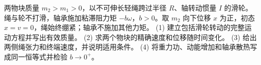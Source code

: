 两物块质量 \(m_2>m_1>0\)，以不可伸长轻绳跨过半径 \(R\)、轴转动惯量 \(I\) 的滑轮。绳与轮不打滑，轴承施加粘滞阻力矩 \(-b\omega\)，\(b>0\)。取 \(m_2\) 向下位移 \(x\) 为正，初态 \(x=v=0\)，绳始终绷紧；轴承不施加其他力矩。
(1) 建立包括滑轮转动的完整运动方程并写出有效质量。
(2) 求两个物块的精确速度和位移随时间变化。
(3) 给出两侧绳张力和终端速度，并说明适用条件。
(4) 将重力功、动能增加和轴承散热写成同一恒等式并检验 \(b\to0^+\)。
